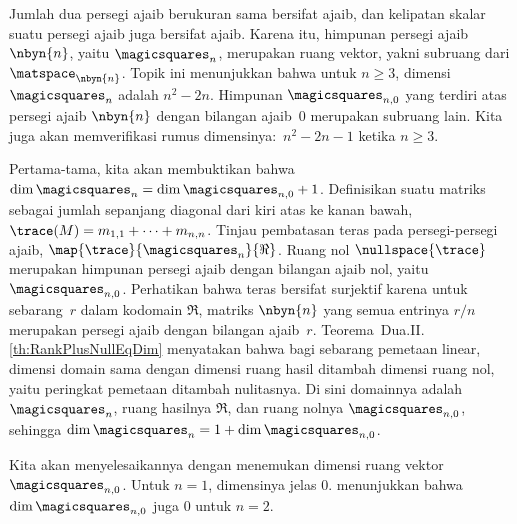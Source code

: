 Jumlah dua persegi ajaib berukuran sama bersifat ajaib, dan kelipatan skalar
suatu persegi ajaib juga bersifat ajaib. Karena itu, himpunan persegi ajaib
$\nbyn{n}$, yaitu $\magicsquares_n$, merupakan ruang vektor, yakni subruang
dari $\matspace_{\nbyn{n}}$.
Topik ini menunjukkan bahwa untuk $n\geq 3$, dimensi $\magicsquares_n$ adalah
$n^2-2n$.
Himpunan $\magicsquares_{n,0}$ yang terdiri atas persegi ajaib $\nbyn{n}$
dengan bilangan ajaib~$0$ merupakan subruang lain. Kita juga akan memverifikasi
rumus dimensinya:~$n^2-2n-1$ ketika $n\geq 3$.

Pertama-tama, kita akan membuktikan bahwa
$\dim\magicsquares_n=\dim\magicsquares_{n,0}+1$.
Definisikan  suatu
matriks sebagai jumlah sepanjang diagonal dari kiri atas ke kanan bawah,
$\trace (M)=m_{1,1}+\cdots+m_{n,n}$.
Tinjau pembatasan teras pada persegi-persegi ajaib,
$\map{\trace}{\magicsquares_n}{\Re}$.
Ruang nol $\nullspace{\trace}$ merupakan himpunan persegi ajaib dengan bilangan
ajaib nol, yaitu $\magicsquares_{n,0}$.
Perhatikan bahwa teras bersifat surjektif karena untuk sebarang~$r$ dalam
kodomain $\Re$, matriks $\nbyn{n}$ yang semua entrinya $r/n$ merupakan persegi
ajaib dengan bilangan ajaib~$r$.
Teorema~Dua.II.\ref{th:RankPlusNullEqDim} menyatakan bahwa bagi sebarang
pemetaan linear, dimensi domain sama dengan dimensi ruang hasil ditambah
dimensi ruang nol, yaitu peringkat pemetaan ditambah nulitasnya.
Di sini domainnya adalah $\magicsquares_n$, ruang hasilnya $\Re$, dan ruang
nolnya $\magicsquares_{n,0}$, sehingga
$\dim\magicsquares_n=1+\dim\magicsquares_{n,0}$.

Kita akan menyelesaikannya dengan menemukan dimensi ruang vektor
$\magicsquares_{n,0}$.
Untuk $n=1$, dimensinya jelas $0$.
 menunjukkan bahwa
$\dim\magicsquares_{n,0}$ juga $0$ untuk $n=2$.

